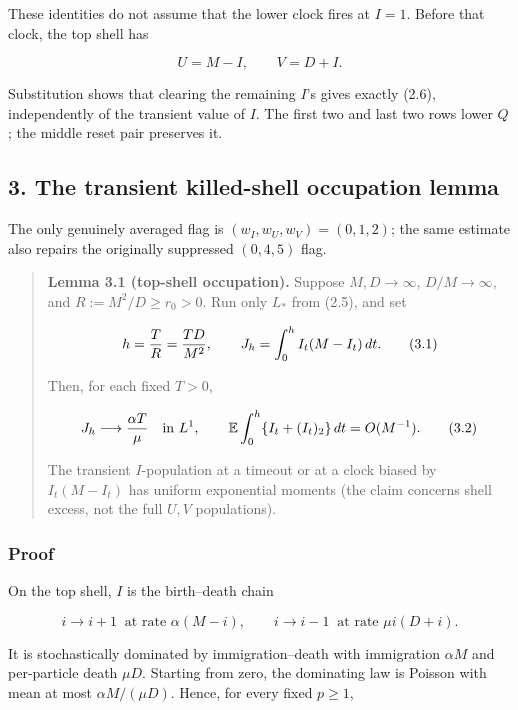 These identities do not assume that the lower clock fires at \(I=1\).
Before that clock, the top shell has

\[
 U=M-I,\qquad V=D+I.                                   \tag{2.7}
\]

Substitution shows that clearing the remaining \(I\)'s gives exactly
(2.6), independently of the transient value of \(I\). The first two and
last two rows lower \(Q\); the middle reset pair preserves it.

\subsection{3. The transient killed-shell occupation
lemma}

The only genuinely averaged flag is \((w_I,w_U,w_V)=(0,1,2)\); the same
estimate also repairs the originally suppressed \((0,4,5)\) flag.

\begin{quote}
\textbf{Lemma 3.1 (top-shell occupation).} Suppose \(M,D\to\infty\),
\(D/M\to\infty\), and \(R:=M^2/D\ge r_0>0\). Run only \(L_*\) from
(2.5), and set

\[
h={T\over R}={TD\over M^2},\qquad
J_h=\int_0^h I_t(M-I_t)\,dt.                         \tag{3.1}
\]

Then, for each fixed \(T>0\),

\[
J_h\longrightarrow{\alpha T\over\mu}
\quad\text{in }L^1,\qquad
{\mathbb E}\int_0^h\{I_t+(I_t)_2\}\,dt=O(M^{-1}).
\tag{3.2}
\]

The transient \(I\)-population at a timeout or at a clock biased by
\(I_t(M-I_t)\) has uniform exponential moments (the claim concerns shell
excess, not the full \(U,V\) populations).
\end{quote}

\subsubsection{Proof}

On the top shell, \(I\) is the birth--death chain

\[
 i\longrightarrow i+1\ \text{ at rate }\alpha(M-i),
 \qquad
 i\longrightarrow i-1\ \text{ at rate }\mu i(D+i).
\tag{3.3}
\]

It is stochastically dominated by immigration--death with immigration
\(\alpha M\) and per-particle death \(\mu D\). Starting from zero, the
dominating law is Poisson with mean at most \(\alpha M/(\mu D)\). Hence,
for every fixed \(p\ge1\),

